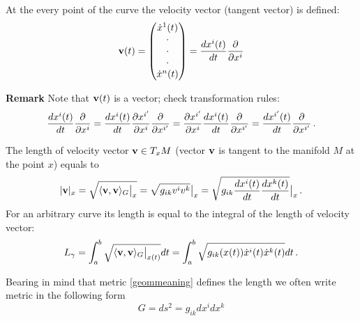 \documentclass[12pt]{article}
\theoremstyle{theorem}
\numberwithin{equation}{section}
\begin{document}
  At the every point of the curve 
the velocity vector (tangent vector)
  is defined:
\begin{equation*}\label{velvector}
  {\bf v}(t)=\begin{pmatrix}
       \dot x^1 (t)\\
             \cdot\\
             \cdot\\
             \cdot\\
             \dot x^n(t)
         \end{pmatrix}
        ={dx^i(t)\over dt}{\partial\over \partial x^i}
\end{equation*}

{\bf Remark}  Note that ${\bf v}(t)$  is a vector; check transformation rules: 
          \begin{equation*}
       {dx^i(t)\over dt}{\partial\over \partial x^i}=
       {dx^i(t)\over dt}
  {\partial x^{i'}\over \partial x^i}{\partial\over \partial x^{i'}}=
{\partial x^{i'}\over \partial x^i}{dx^i(t)\over dt}
  {\partial\over \partial x^{i'}}=
       {dx^{i'}(t)\over dt}{\partial\over \partial x^{i'}}\,.
  \end{equation*}
        


The length of velocity vector ${\bf v}\in T_xM$
(vector ${\bf v}$ is tangent to the manifold $M$ at the point $x$)
equals to
     \begin{equation*}\label{speedforaunt}
       |{\bf v}|_x=\sqrt {\langle {\bf v},{\bf v}\rangle_G\big\vert_{x}}=
       \sqrt{g_{ik}v^iv^k}\big\vert_{x}=
       \sqrt{g_{ik}{dx^i(t)\over dt}
     {dx^k(t)\over dt}}\big\vert_{x}\,.
     \end{equation*}
For an arbitrary curve its length is equal
 to the integral of the length of velocity vector:
\begin{equation}\label{lengthofthecurve}
  L_\gamma=\int_a^b \sqrt {\langle{\bf v},{\bf v}\rangle_G\big\vert_{x(t)}}dt=
  \int_a^b \sqrt {g_{ik}(x(t))\dot x^i(t) \dot x^k(t)}dt\,.
\end{equation}

Bearing in mind that metric \eqref{geommeaning} defines the length
we often write metric in the following form
\begin{equation*}\label{metric}
  G=ds^2=g_{ik}dx^idx^k
\end{equation*}

\smallskip
\end{document}
